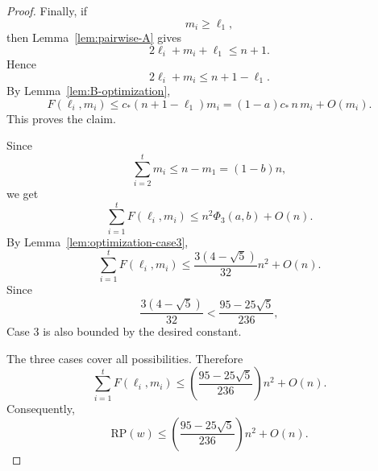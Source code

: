 \documentclass[10pt,a4paper]{amsart}
\newcommand{\rp}{\mathrm{RP}}
\begin{document}
\begin{proof}
Finally, if
\[
        m_i\ge \ell_1,
\]
then Lemma~\ref{lem:pairwise-A} gives
\[
        2\ell_i+m_i+\ell_1\le n+1.
\]
Hence
\[
        2\ell_i+m_i\le n+1-\ell_1.
\]
By Lemma~\ref{lem:B-optimization},
\[
        F(\ell_i,m_i)
        \le
        c_*(n+1-\ell_1)m_i
        =
        (1-a)c_*\,n\,m_i+O(m_i).
\]
This proves the claim.

Since
\[
        \sum_{i=2}^tm_i\le n-m_1=(1-b)n,
\]
we get
\[
        \sum_{i=1}^tF(\ell_i,m_i)
        \le
        n^2\Phi_3(a,b)+O(n).
\]
By Lemma~\ref{lem:optimization-case3},
\[
        \sum_{i=1}^tF(\ell_i,m_i)
        \le
        \frac{3(4-\sqrt5)}{32}n^2+O(n).
\]
Since
\[
        \frac{3(4-\sqrt5)}{32}
        <
        \frac{95-25\sqrt5}{236},
\]
Case 3 is also bounded by the desired constant.

\medskip

The three cases cover all possibilities. Therefore
\[
        \sum_{i=1}^tF(\ell_i,m_i)
        \le
        \left(\frac{95-25\sqrt5}{236}\right)n^2+O(n).
\]
Consequently,
\[
        \rp(w)
        \le
        \left(\frac{95-25\sqrt5}{236}\right)n^2+O(n).
\]
\end{proof}
\end{document}
